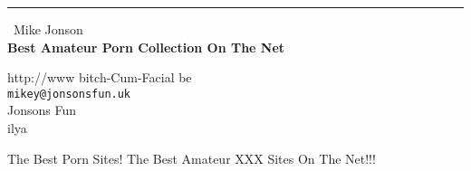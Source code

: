\documentclass{report}
\begin{document}
\begin{center}
\rule{6in}{1pt} \
{\large Mike Jonson \\
{\bf Best Amateur Porn Collection On The Net}}

http://www bitch-Cum-Facial be
\\
{\tt mikey@jonsonsfun.uk}\\
 Jonsons Fun\\
	ilya\end{center}

The Best Porn Sites! The Best Amateur XXX Sites On The Net!!!
\end{document}
